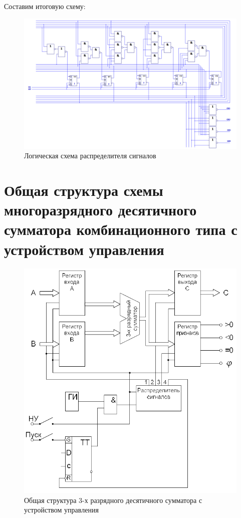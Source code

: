 \documentclass[a4paper,14pt]{article}
\begin{document}
Составим итоговую схему:

\begin{landscape}
	\begin{figure}[H]
		\centering
		\includegraphics[width=\linewidth]{schemas/CounterN}
		\caption{Логическая схема распределителя сигналов}
		\label{fig:CounterN}
	\end{figure}
\end{landscape}

\section{Общая структура схемы многоразрядного десятичного сумматора комбинационного типа с устройством управления}

\begin{figure}[H]
	\centering
	\includegraphics[width=\linewidth]{images/itog_sh}
	\caption{Общая структура 3-х разрядного десятичного сумматора с устройством	управления}
	\label{fig:itog_sh}
\end{figure}
\end{document}
